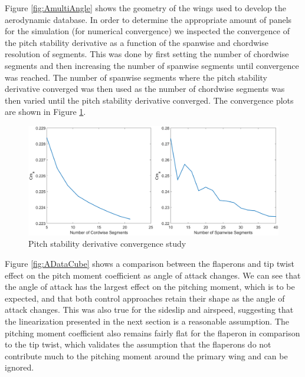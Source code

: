 \documentclass[11pt]{ucthesis}
\begin{document}
Figure \ref{fig:AmultiAngle} shows the geometry of the wings used to develop the aerodynamic database. In order to determine the appropriate amount of panels for the simulation (for numerical convergence) we inspected the convergence of the pitch stability derivative as a function of the spanwise and chordwise resolution of segments. This was done by first setting the number of chordwise segments and then increasing the number of spanwise segments until convergence was reached. The number of spanwise segments where the pitch stability derivative converged was then used as the number of chordwise segments was then varied until the pitch stability derivative converged. The convergence plots are shown in Figure \ref{fig:Aconverge}. 

\begin{figure}[thpb]
\centering
\includegraphics[width=1\linewidth]{Figures/SegmentConverge.png}
\caption{Pitch stability derivative convergence study}
\label{fig:Aconverge}
\end{figure}

Figure \ref{fig:ADataCube} shows a comparison between the flaperons and tip twist effect on the pitch moment coefficient as angle of attack changes. We can see that the angle of attack has the largest effect on the pitching moment, which is to be expected, and that both control approaches retain their shape as the angle of attack changes. This was also true for the sideslip and airspeed, suggesting that the linearization presented in the next section is a reasonable assumption. The pitching moment coefficient also remains fairly flat for the flaperon in comparison to the tip twist, which validates the assumption that the flaperons do not contribute much to the pitching moment around the primary wing and can be ignored.
\end{document}
